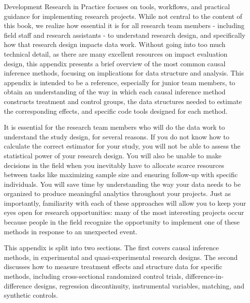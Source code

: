 
\begin{fullwidth}
Development Research in Practice focuses on tools, workflows, and practical 
guidance for implementing research projects. 
While not central to the content of this book, 
we realize how essential it is for all research team members
- including field staff and research assistants - 
to understand research design, 
and specifically how that research design impacts data work. 
Without going into too much technical detail,
as there are many excellent resources on impact evaluation design,
this appendix presents a brief overview
of the most common causal inference methods,
focusing on implications for data structure and analysis.
This appendix is intended to be a reference, 
especially for junior team members, 
to obtain an understanding of the way in which each 
causal inference method constructs treatment and control groups,
the data structures needed to estimate the corresponding effects,
and specific code tools designed for each method.

It is essential for the research team members who will do the data work 
to understand the study design, for several reasons.
If you do not know how to calculate the correct estimator for your study,
you will not be able to assess the statistical power of your research design.
You will also be unable to make decisions in the field
when you inevitably have to allocate scarce resources
between tasks like maximizing sample size
and ensuring follow-up with specific individuals.
You will save time by understanding the way your data needs to be organized
to produce meaningful analytics throughout your projects.
Just as importantly, familiarity with each of these approaches
will allow you to keep your eyes open for research opportunities:
many of the most interesting projects occur because people in the field
recognize the opportunity to implement one of these methods
in response to an unexpected event.

This appendix is split into two sections.
The first covers causal inference methods, 
in experimental and quasi-experimental research designs.
The second discusses how to measure treatment effects and structure data for specific methods,
including cross-sectional randomized control trials, difference-in-difference designs,
regression discontinuity, instrumental variables, matching, and synthetic controls.

\end{fullwidth}

